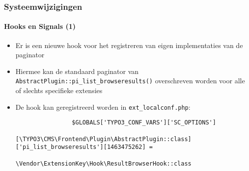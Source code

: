 \begin{frame}[fragile]
	\frametitle{Systeemwijzigingen}
	\framesubtitle{Hooks en Signals (1)}

	\lstset{basicstyle=\tiny\ttfamily}

	\begin{itemize}

		\item Er is een nieuwe hook voor het registreren van eigen implementaties van de paginator

		\item Hiermee kan de standaard paginator van \texttt{AbstractPlugin::pi\_list\_browseresults()}
			overschreven worden voor alle of slechts specifieke extensies

		\item De hook kan geregistreerd worden in \texttt{ext\_localconf.php}:

			\begin{lstlisting}
				$GLOBALS['TYPO3_CONF_VARS']['SC_OPTIONS']
				  [\TYPO3\CMS\Frontend\Plugin\AbstractPlugin::class]['pi_list_browseresults'][1463475262] =
				  \Vendor\ExtensionKey\Hook\ResultBrowserHook::class
			\end{lstlisting}

	\end{itemize}

\end{frame}


